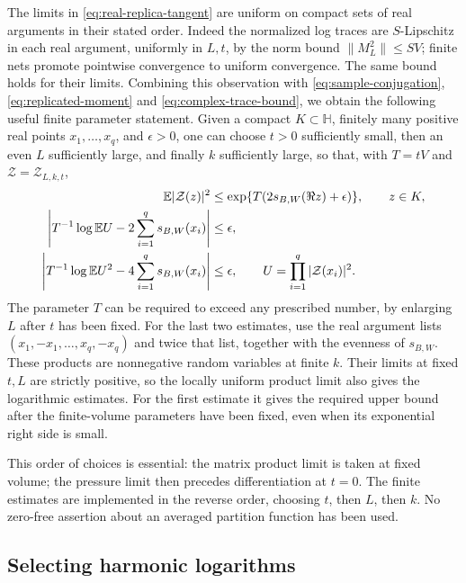 The limits in \eqref{eq:real-replica-tangent} are uniform on compact
sets of real arguments in their stated order.  Indeed the normalized
log traces are $S$-Lipschitz in each real argument, uniformly in $L,t$,
by the norm bound $\|M_L^2\|\le SV$; finite nets promote pointwise
convergence to uniform convergence.  The same bound holds for their
limits.  Combining this observation with
\eqref{eq:sample-conjugation}, \eqref{eq:replicated-moment} and
\eqref{eq:complex-trace-bound}, we obtain the following useful finite
parameter statement.  Given a compact $K\subset\mathbb H$, finitely
many positive real points $x_1,\ldots,x_q$, and $\epsilon>0$, one can
choose $t>0$ sufficiently small, then an even $L$ sufficiently large,
and finally $k$ sufficiently large, so that, with $T=tV$ and
$\mathcal Z=\mathcal Z_{L,k,t}$,
\begin{align}
 \mathbb E|\mathcal Z(z)|^2
      &\le \exp\{T(2s_{B,W}(\Re z)+\epsilon)\},\qquad z\in K,
          \label{eq:complex-second-moment}\\
 \left|T^{-1}\log\mathbb E U-2\sum_{i=1}^q s_{B,W}(x_i)\right|
      &\le\epsilon,
          \label{eq:product-first-moment}\\
 \left|T^{-1}\log\mathbb E U^2-4\sum_{i=1}^q s_{B,W}(x_i)\right|
      &\le\epsilon,
 \qquad U=\prod_{i=1}^q|\mathcal Z(x_i)|^2.
          \label{eq:product-second-moment}
\end{align}
The parameter $T$ can be required to exceed any prescribed number,
by enlarging $L$ after $t$ has been fixed.  For the last two estimates,
use the real argument lists $(x_1,-x_1,\ldots,x_q,-x_q)$ and twice that
list, together with the evenness of $s_{B,W}$.  These products are
nonnegative random variables at finite $k$.  Their limits at fixed
$t,L$ are strictly positive, so the locally uniform product limit also
gives the logarithmic estimates.  For the first estimate it gives the
required upper bound after the finite-volume parameters have been
fixed, even when its exponential right side is small.

This order of choices is essential: the matrix product limit is taken
at fixed volume; the pressure limit then precedes differentiation at
$t=0$.  The finite estimates are implemented in the reverse order,
choosing $t$, then $L$, then $k$.  No zero-free assertion about an
averaged partition function has been used.

\subsection{Selecting harmonic logarithms}

